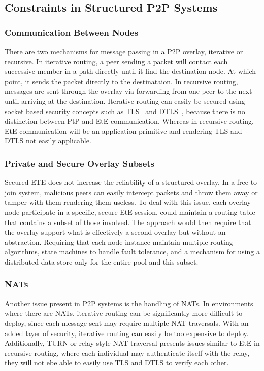 \documentclass[conference]{IEEEtran}
\begin{document}
\subsection{Constraints in Structured P2P Systems}
\subsubsection{Communication Between Nodes}
There are two mechanisms for message passing in a P2P overlay, iterative or
recursive.  In iterative routing, a peer sending a packet will contact each
successive member in a path directly until it find the destination node.  At
which point, it sends the packet directly to the destinataion.  In recursive
routing, messages are sent through the overlay via forwarding from one peer to
the next until arriving at the destination.  Iterative routing can easily be
secured using socket based security concepts such as TLS~\cite{tls} and
DTLS~\cite{dtls}, because there is no distinction between PtP
and EtE communication.  Whereas in recursive routing, EtE
communication will be an application primitive and rendering TLS and DTLS not
easily applicable.

\subsubsection{Private and Secure Overlay Subsets}
Secured ETE does not increase the reliability of a structured
overlay.  In a free-to-join system, malicious peers can easily intercept packets
and throw them away or tamper with them rendering them useless.  To deal with
this issue, each overlay node participate in a specific, secure EtE session,
could maintain a routing table that contains a subset of those involved.  The
approach would then require that the overlay support what is effectively a
second overlay but without an abstraction.  Requiring that each node instance
maintain multiple routing algorithms, state machines to handle fault tolerance,
and a mechanism for using a distributed data store only for the entire pool and
this subset.

\subsubsection{NATs}
Another issue present in P2P systems is the handling of NATs.  In environments
where there are NATs, iterative routing can be significantly more difficult to
deploy, since each message sent may require multiple NAT traversals.  With an
added layer of security, iterative routing can easily be too expensive to
deploy.   Additionally, TURN or relay style NAT traversal presents issues
similar to EtE in recursive routing, where each individual may authenticate
itself with the relay, they will not ebe able to easily use TLS and DTLS to
verify each other.
\end{document}
